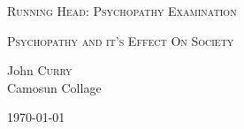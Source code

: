 \begin{titlepage}
\textsc{\small Running Head: Psychopathy Examination}\\
\begin{center}
\textsc{\huge Psychopathy and it's Effect On Society}\\[1.5cm]

\begin{minipage}{0.4\textwidth}
\begin{flushleft} \large
John \textsc{Curry}\\
Camosun Collage
\end{flushleft}
\end{minipage}
\vfill
{\large \today}
\end{center}
\end{titlepage}
